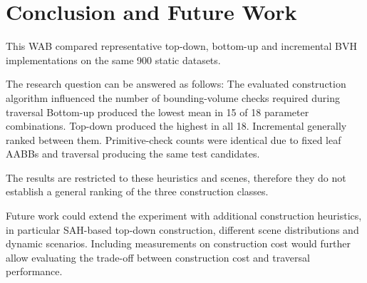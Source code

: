 \chapter{Conclusion and Future Work}
This WAB compared representative top-down, bottom-up and incremental BVH implementations on the same 900 static datasets.

The research question can be answered as follows:
The evaluated construction algorithm influenced the number of bounding-volume checks required during traversal
Bottom-up produced the lowest mean in 15 of 18 parameter combinations. 
Top-down produced the highest in all 18.
Incremental generally ranked between them.
Primitive-check counts were identical due to fixed leaf AABBs and traversal producing the same test candidates.

The results are restricted to these heuristics and scenes, therefore they do not establish a general ranking of the three construction classes.

Future work could extend the experiment with additional construction heuristics, in particular SAH-based top-down construction, different scene distributions and dynamic scenarios.
Including measurements on construction cost would further allow evaluating the trade-off between construction cost and traversal performance.

\newpage
